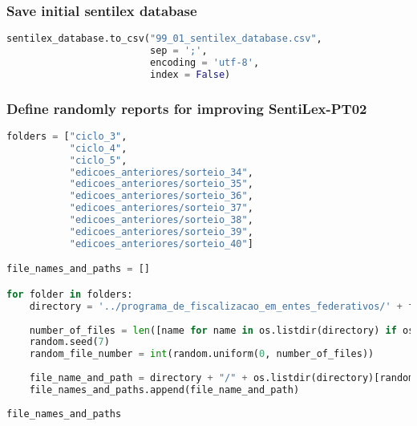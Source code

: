 \subsubsection{Save initial sentilex
database}\label{save-initial-sentilex-database}

\begin{lstlisting}[language=Python]
sentilex_database.to_csv("99_01_sentilex_database.csv",
                         sep = ';',
                         encoding = 'utf-8',
                         index = False)
\end{lstlisting}

\subsubsection{Define randomly reports for improving
SentiLex-PT02}\label{define-randomly-reports-for-improving-sentilex-pt02}

\begin{lstlisting}[language=Python]
folders = ["ciclo_3",
           "ciclo_4",
           "ciclo_5",
           "edicoes_anteriores/sorteio_34",
           "edicoes_anteriores/sorteio_35",
           "edicoes_anteriores/sorteio_36",
           "edicoes_anteriores/sorteio_37",
           "edicoes_anteriores/sorteio_38",
           "edicoes_anteriores/sorteio_39",
           "edicoes_anteriores/sorteio_40"]

file_names_and_paths = []

for folder in folders:
    directory = '../programa_de_fiscalizacao_em_entes_federativos/' + folder
    
    number_of_files = len([name for name in os.listdir(directory) if os.path.isfile(os.path.join(directory, name))]) - 3
    random.seed(7)
    random_file_number = int(random.uniform(0, number_of_files))
    
    file_name_and_path = directory + "/" + os.listdir(directory)[random_file_number]
    file_names_and_paths.append(file_name_and_path)
    
file_names_and_paths
\end{lstlisting}

